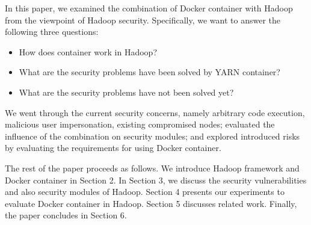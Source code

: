 In this paper, we examined the combination of Docker container with Hadoop from the viewpoint of Hadoop security. Specifically, we want to answer the following three questions:

\begin{itemize}
\item {How does container work in Hadoop?}
\item {What are the security problems have been solved by YARN container?}
\item {What are the security problems have not been solved yet?}
\end{itemize}

We went through the current security concerns, namely arbitrary code execution, malicious user impersonation, existing compromised nodes; evaluated the influence of the combination on security modules; and explored introduced risks by evaluating the requirements for using Docker container.

The rest of the paper proceeds as follows. We introduce Hadoop framework and Docker container in Section 2. In Section 3, we discuss the security vulnerabilities and also security modules of Hadoop. Section 4 presents our experiments to evaluate Docker container in Hadoop. Section 5 discusses related work. Finally, the paper concludes in Section 6.
